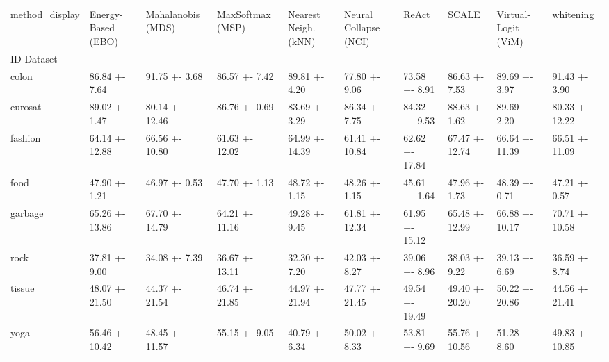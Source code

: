 \begin{tabular}{llllllllll}
\toprule
method_display & Energy-Based (EBO) & Mahalanobis (MDS) & MaxSoftmax (MSP) & Nearest Neigh. (kNN) & Neural Collapse (NCI) & ReAct & SCALE & Virtual-Logit (ViM) & whitening \\
ID Dataset &  &  &  &  &  &  &  &  &  \\
\midrule
colon & 86.84 +- 7.64 & 91.75 +- 3.68 & 86.57 +- 7.42 & 89.81 +- 4.20 & 77.80 +- 9.06 & 73.58 +- 8.91 & 86.63 +- 7.53 & 89.69 +- 3.97 & 91.43 +- 3.90 \\
eurosat & 89.02 +- 1.47 & 80.14 +- 12.46 & 86.76 +- 0.69 & 83.69 +- 3.29 & 86.34 +- 7.75 & 84.32 +- 9.53 & 88.63 +- 1.62 & 89.69 +- 2.20 & 80.33 +- 12.22 \\
fashion & 64.14 +- 12.88 & 66.56 +- 10.80 & 61.63 +- 12.02 & 64.99 +- 14.39 & 61.41 +- 10.84 & 62.62 +- 17.84 & 67.47 +- 12.74 & 66.64 +- 11.39 & 66.51 +- 11.09 \\
food & 47.90 +- 1.21 & 46.97 +- 0.53 & 47.70 +- 1.13 & 48.72 +- 1.15 & 48.26 +- 1.15 & 45.61 +- 1.64 & 47.96 +- 1.73 & 48.39 +- 0.71 & 47.21 +- 0.57 \\
garbage & 65.26 +- 13.86 & 67.70 +- 14.79 & 64.21 +- 11.16 & 49.28 +- 9.45 & 61.81 +- 12.34 & 61.95 +- 15.12 & 65.48 +- 12.99 & 66.88 +- 10.17 & 70.71 +- 10.58 \\
rock & 37.81 +- 9.00 & 34.08 +- 7.39 & 36.67 +- 13.11 & 32.30 +- 7.20 & 42.03 +- 8.27 & 39.06 +- 8.96 & 38.03 +- 9.22 & 39.13 +- 6.69 & 36.59 +- 8.74 \\
tissue & 48.07 +- 21.50 & 44.37 +- 21.54 & 46.74 +- 21.85 & 44.97 +- 21.94 & 47.77 +- 21.45 & 49.54 +- 19.49 & 49.40 +- 20.20 & 50.22 +- 20.86 & 44.56 +- 21.41 \\
yoga & 56.46 +- 10.42 & 48.45 +- 11.57 & 55.15 +- 9.05 & 40.79 +- 6.34 & 50.02 +- 8.33 & 53.81 +- 9.69 & 55.76 +- 10.56 & 51.28 +- 8.60 & 49.83 +- 10.85 \\
\bottomrule
\end{tabular}
